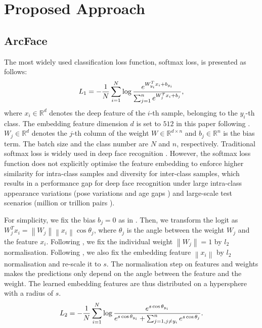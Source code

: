 \documentclass[10pt,twocolumn,letterpaper]{article}
\begin{document}
\section{Proposed Approach}

\subsection{ArcFace}

The most widely used classification loss function, softmax loss, is presented as follows:
\begin{equation}
L_1=-\frac{1}{N}\sum_{i=1}^{N}\log\frac{e^{W^T_{y_i} x_i+b_{y_i}}}{\sum_{j=1}^{n}e^{W^T_j x_i+b_j}},
\label{eq:softmax}
\vspace{-1mm}
\end{equation}
where $x_i\in\mathbb{R}^d$ denotes the deep feature of the $i$-th sample, belonging to the $y_i$-th class. The embedding feature dimension $d$ is set to $512$ in this paper following \cite{wen2016discriminative,zhang2016range,liu2017sphereface,tencent2017CosineFace}. $W_j\in\mathbb{R}^d$ denotes the $j$-th column of the weight $W \in \mathbb{R}^{d \times n}$ and $b_j\in\mathbb{R}^n $ is the bias term. The batch size and the class number are $N$ and $n$, respectively. Traditional softmax loss is widely used in deep face recognition \cite{parkhi2015deep,cao2017vggface2}. However, the softmax loss function does not explicitly optimise the feature embedding to enforce higher similarity for intra-class samples and diversity for inter-class samples, which results in a performance gap for deep face recognition under large intra-class appearance variations (\eg pose variations \cite{sengupta2016frontal,zheng2018cross} and age gaps \cite{Moschoglou2017AgeDB,zheng2017cross}) and large-scale test scenarios (\eg million \cite{kemelmacher2016megaface,whitelam2017iarpa,maze2018iarpa} or trillion pairs \cite{glintweb}).

For simplicity, we fix the bias $b_j=0$ as in \cite{liu2017sphereface}. Then, we transform the logit \cite{pereyra2017regularizing} as $W^T_j x_i=\left \| W_j \right \|\left \| x_i \right \|\cos\theta_j$, where $\theta_j$ is the angle between the weight $W_j$ and the feature $x_i$. Following \cite{liu2017sphereface,tencent2017CosineFace,wang2017normface}, we fix the individual weight $\left \| W_j \right \|=1$ by $l_2$ normalisation. Following \cite{ranjan2017l2,tencent2017CosineFace,wang2017normface,wang2018additive}, we also fix the embedding feature $\left \| x_i \right \|$ by $l_2$ normalisation and re-scale it to $s$.
The normalisation step on features and weights makes the predictions only depend on the angle between the feature and the weight. The learned embedding features are thus distributed on a hypersphere with a radius of $s$.
\begin{equation}
{L_2}=-\frac{1}{N}\sum_{i=1}^{N}\log\frac{e^{s\cos\theta_{y_i}}}{e^{s\cos\theta_{y_i}}+\sum_{j=1,j\neq  y_i}^{n}e^{s\cos\theta_{j}}}.
\label{eq:l2featweight}
\vspace{-1mm}
\end{equation}
\end{document}
